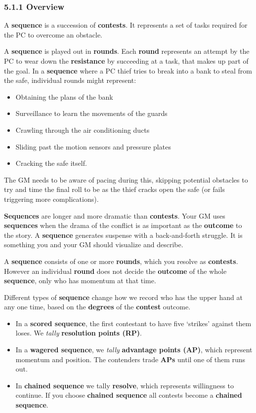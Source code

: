 \documentclass[
  11pt,
]{article}
\providecommand{\tightlist}{%
  \setlength{\itemsep}{0pt}\setlength{\parskip}{0pt}}
\begin{document}
\hypertarget{overview}{%
\subsubsection{5.1.1 Overview}\label{overview}}

A \textbf{sequence} is a succession of \textbf{contests}. It represents
a set of tasks required for the PC to overcome an obstacle.

A \textbf{sequence} is played out in \textbf{rounds}. Each
\textbf{round} represents an attempt by the PC to wear down the
\textbf{resistance} by succeeding at a task, that makes up part of the
goal. In a \textbf{sequence} where a PC thief tries to break into a bank
to steal from the safe, individual rounds might represent:

\begin{itemize}
\tightlist
\item
  Obtaining the plans of the bank
\item
  Surveillance to learn the movements of the guards
\item
  Crawling through the air conditioning ducts
\item
  Sliding past the motion sensors and pressure plates
\item
  Cracking the safe itself.
\end{itemize}

The GM needs to be aware of pacing during this, skipping potential
obstacles to try and time the final roll to be as the thief cracks open
the safe (or fails triggering more complications).

\textbf{Sequences} are longer and more dramatic than \textbf{contests}.
Your GM uses \textbf{sequences} when the drama of the conflict is as
important as the \textbf{outcome} to the story. A \textbf{sequence}
generates suspense with a back-and-forth struggle. It is something you
and your GM should visualize and describe.

A \textbf{sequence} consists of one or more \textbf{rounds}, which you
resolve as \textbf{contests}. However an individual \textbf{round} does
not decide the \textbf{outcome} of the whole \textbf{sequence}, only who
has momentum at that time.

Different types of \textbf{sequence} change how we record who has the
upper hand at any one time, based on the \textbf{degrees} of the
\textbf{contest} outcome.

\begin{itemize}
\tightlist
\item
  In a \textbf{scored sequence}, the first contestant to have five
  `strikes' against them loses. We \emph{tally} \textbf{resolution
  points (RP)}.
\item
  In a \textbf{wagered sequence}, we \emph{tally} \textbf{advantage
  points (AP)}, which represent momentum and position. The contenders
  trade \textbf{APs} until one of them runs out.
\item
  In \textbf{chained sequence} we tally \textbf{resolve}, which
  represents willingness to continue. If you choose \textbf{chained
  sequence} all contests become a \textbf{chained sequence}.
\end{itemize}
\end{document}
